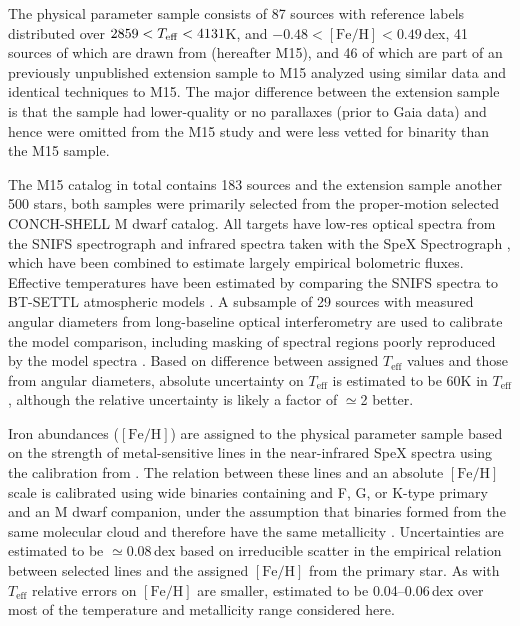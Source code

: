 \documentclass[modern]{aastex62}
\newcommand{\teff}{T_{\mathrm{eff}}}
\newcommand{\feh}{[{\mathrm{Fe}/\mathrm{H}}]}
\begin{document}
The physical parameter sample consists of 87 sources with reference labels distributed over $2859 <T_{\rm eff} < 4131$K, and $-0.48 < \feh < 0.49$\,dex, 41 sources of which are drawn from \citealt{Mann:2015} (hereafter M15), and 46 of which are part of an previously unpublished extension sample to M15 analyzed using similar data and identical techniques to M15. The major difference between the extension sample is that the sample had lower-quality or no parallaxes (prior to Gaia data) and hence were omitted from the M15 study and were less vetted for binarity than the M15 sample.

The M15 catalog in total contains 183 sources and the extension sample another 500 stars, both samples were primarily selected from the proper-motion selected CONCH-SHELL \citep{Gaidos:2013} M dwarf catalog. All targets have low-res optical spectra from the SNIFS spectrograph \citep{Lantz:2004} and infrared spectra taken with the SpeX Spectrograph \citep{Rayner:2003}, which have been combined to estimate largely empirical bolometric fluxes. Effective temperatures have been estimated by comparing the SNIFS spectra to BT-SETTL atmospheric models \citep{Allard:2011}. A subsample of 29 sources with measured angular diameters from long-baseline optical interferometry \citep{Boyajian:2012} are used to calibrate the model comparison, including masking of spectral regions poorly reproduced by the model spectra \citep{Mann:2013c}. Based on difference between assigned $\teff$ values and those from angular diameters, absolute uncertainty on $\teff$ is estimated to be 60K in $\teff$, although the relative uncertainty is likely a factor of $\simeq$2 better.

Iron abundances ($\feh$) are assigned to the physical parameter sample based on the strength of metal-sensitive lines in the near-infrared SpeX spectra \citep{RojasAyala:2010} using the calibration from \citet{Mann:2013a}. The relation between these lines and an absolute $\feh$ scale is calibrated using wide binaries containing and F, G, or K-type primary and an M dwarf companion, under the assumption that binaries formed from the same molecular cloud and therefore have the same metallicity \citep{Bonfils:2005}. Uncertainties are estimated to be $\simeq$0.08\,dex based on irreducible scatter in the empirical relation between selected lines and the assigned $\feh$ from the primary star. As with $\teff$ relative errors on $\feh$ are smaller, estimated to be 0.04--0.06\,dex over most of the temperature and metallicity range considered here.
\end{document}
